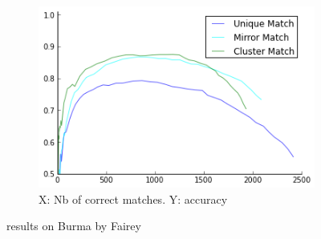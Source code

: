 \documentclass{article}
\begin{document}
\begin{figure}
{\begin{subfigure}[t]{0.35\textwidth}
			\centering
			\includegraphics[width=\textwidth]{images/result_fairey_burma}
			\caption{X: Nb of correct matches. Y: accuracy}
			\label{fig:result_burma}
		\end{subfigure}%
	}%
	\label{fig:burma}
	\caption{results on Burma by Fairey}
\end{figure}
\end{document}
